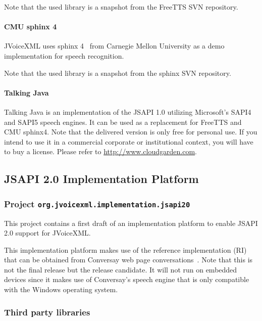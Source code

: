 \documentclass[11pt,a4paper]{article}
\begin{document}
Note that the used library is a snapshot from the FreeTTS SVN repository.

\paragraph{CMU sphinx 4}
\label{sec:sphinx}

JVoiceXML uses sphinx 4~\cite{sphinx} from Carnegie Mellon University
as a demo implementation for speech recognition.

Note that the used library is a snapshot from the sphinx SVN repository.

\paragraph{Talking Java}

Talking Java is an implementation of the JSAPI 1.0 utilizing Microsoft's
SAPI4 and SAPI5 speech engines. It can be used as a replacement for FreeTTS
and CMU sphinx4. Note that the delivered version is only free for personal use.
If you intend to use it in a commercial corporate or institutional context, you
will have to buy a license. Please refer to \url{http://www.cloudgarden.com}.

\subsection{JSAPI 2.0 Implementation Platform}
\subsubsection{Project \texttt{org.jvoicexml.implementation.jsapi20}}

This project contains a first draft of an implementation platform to enable
JSAPI 2.0 support for JVoiceXML.

This implementation platform makes use of the reference implementation (RI) that
can be obtained from Conversay web page
conversations~\cite{conversay:jsr113}. Note that this is not the final release
but the release candidate. It will not run on embedded devices since it makes
use of Conversay's speech engine that is only compatible with the Windows
operating system.

\subsubsection{Third party libraries}
\label{sec:jsapi20-third-party-libr}
\end{document}
